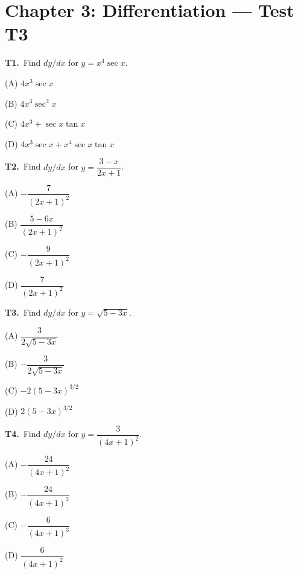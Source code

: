 \documentclass[11pt]{article}
\begin{document}
\section*{Chapter 3: Differentiation --- Test T3}

\bigskip\noindent\textbf{T1.}\ Find $dy/dx$ for $y = x^4 \sec x$.
\begin{list}{}{\setlength{\leftmargin}{3em}\setlength{\labelwidth}{2.5em}\setlength{\itemsep}{0pt}\setlength{\topsep}{2pt}}
\item[(A)] $4x^3 \sec x$
\item[(B)] $4x^3 \sec^2 x$
\item[(C)] $4x^3 + \sec x \tan x$
\item[(D)] $4x^3 \sec x + x^4 \sec x \tan x$
\end{list}

\bigskip\noindent\textbf{T2.}\ Find $dy/dx$ for $y = \dfrac{3-x}{2x+1}$.
\begin{list}{}{\setlength{\leftmargin}{3em}\setlength{\labelwidth}{2.5em}\setlength{\itemsep}{0pt}\setlength{\topsep}{2pt}}
\item[(A)] $-\dfrac{7}{(2x+1)^2}$
\item[(B)] $\dfrac{5-6x}{(2x+1)^2}$
\item[(C)] $-\dfrac{9}{(2x+1)^2}$
\item[(D)] $\dfrac{7}{(2x+1)^2}$
\end{list}

\bigskip\noindent\textbf{T3.}\ Find $dy/dx$ for $y = \sqrt{5-3x}$.
\begin{list}{}{\setlength{\leftmargin}{3em}\setlength{\labelwidth}{2.5em}\setlength{\itemsep}{0pt}\setlength{\topsep}{2pt}}
\item[(A)] $\dfrac{3}{2\sqrt{5-3x}}$
\item[(B)] $-\dfrac{3}{2\sqrt{5-3x}}$
\item[(C)] $-2(5-3x)^{3/2}$
\item[(D)] $2(5-3x)^{3/2}$
\end{list}

\bigskip\noindent\textbf{T4.}\ Find $dy/dx$ for $y = \dfrac{3}{(4x+1)^2}$.
\begin{list}{}{\setlength{\leftmargin}{3em}\setlength{\labelwidth}{2.5em}\setlength{\itemsep}{0pt}\setlength{\topsep}{2pt}}
\item[(A)] $-\dfrac{24}{(4x+1)^2}$
\item[(B)] $-\dfrac{24}{(4x+1)^3}$
\item[(C)] $-\dfrac{6}{(4x+1)^3}$
\item[(D)] $\dfrac{6}{(4x+1)^2}$
\end{list}
\end{document}
